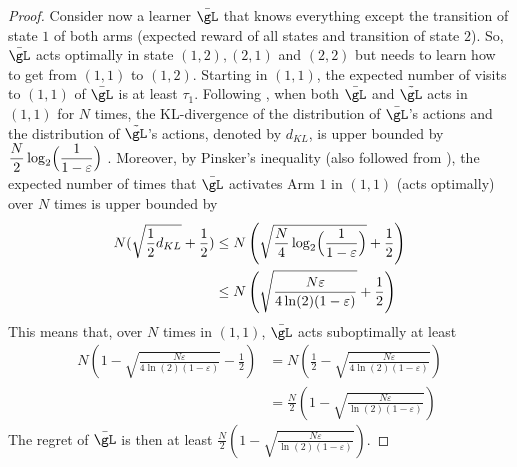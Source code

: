 \begin{proof}
    Consider now a learner $\bar{\gL}$ that knows everything except the transition of state $1$ of both arms (expected reward of all states and transition of state $2$).
    So, $\bar{\gL}$ acts optimally in state $(1,2), (2,1)$ and $(2,2)$ but needs to learn how to get from $(1,1)$ to $(1,2)$.
    Starting in $(1,1)$, the expected number of visits to $(1,1)$ of $\bar{\gL}$ is at least $\tau_1$.
    Following \cite{osband2016lower}, when both $\bar{\gL}$ and $\tilde{\gL}$ acts in $(1,1)$ for $N$ times, the KL-divergence of the distribution of $\bar{\gL}$'s actions and the distribution of $\tilde{\gL}$'s actions, denoted by $d_{KL}$, is upper bounded by $\displaystyle\frac{N}{2}\log_2\Bigl(\frac1{1-\varepsilon}\Bigr)$ \cite[Lemma~2]{osband2016lower}.
    Moreover, by Pinsker's inequality (also followed from \cite{osband2016lower}), the expected number of times that $\bar{\gL}$ activates Arm $1$ in $(1,1)$ (\ie acts optimally) over $N$ times is upper bounded by
    \begin{align*}
        N(\sqrt{\frac12d_{KL}}+\frac12)
        &\le N\left(\sqrt{\frac{N}4\log_2\Bigl(\frac1{1-\varepsilon}\Bigr)}+\frac12\right) \\
        &\le N\left(\sqrt{\frac{N\varepsilon}{4\ln(2)(1-\varepsilon)}}+\frac12\right)
    \end{align*}
    This means that, over $N$ times in $(1,1)$, $\bar{\gL}$ acts suboptimally at least
    \begin{align*}
        N\left(1-\sqrt{\frac{N\varepsilon}{4\ln(2)(1-\varepsilon)}}-\frac12\right)
        &= N\left(\frac12 -\sqrt{\frac{N\varepsilon}{4\ln(2)(1-\varepsilon)}}\right) \\
        &= \frac{N}2\left(1 -\sqrt{\frac{N\varepsilon}{\ln(2)(1-\varepsilon)}}\right)
    \end{align*}
    The regret of $\bar{\gL}$ is then at least $\frac{N}2 \left(1-\sqrt{\frac{N\varepsilon}{\ln(2)(1-\varepsilon)}}\right)$. %


\end{proof}
